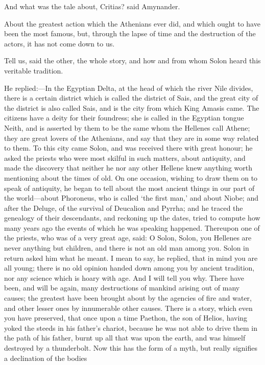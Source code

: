 And what was the tale about, Critias? said Amynander.

About the greatest action which the Athenians ever did, and which ought to
have been the most famous, but, through the lapse of time and the
destruction of the actors, it has not come down to us.

Tell us, said the other, the whole story, and how and from whom Solon
heard this veritable tradition.

He replied:—In the Egyptian Delta, at the head of which the river
Nile divides, there is a certain district which is called the district of
Sais, and the great city of the district is also called Sais, and is the
city from which King Amasis came. The citizens have a deity for their
foundress; she is called in the Egyptian tongue Neith, and is asserted by
them to be the same whom the Hellenes call Athene; they are great lovers
of the Athenians, and say that they are in some way related to them. To
this city came Solon, and was received there with great honour; he asked
the priests who were most skilful in such matters, about antiquity, and
made the discovery that neither he nor any other Hellene knew anything
worth mentioning about the times of old. On one occasion, wishing to draw
them on to speak of antiquity, he began to tell about the most ancient
things in our part of the world—about Phoroneus, who is called ‘the
first man,’ and about Niobe; and after the Deluge, of the survival of
Deucalion and Pyrrha; and he traced the genealogy of their descendants,
and reckoning up the dates, tried to compute how many years ago the events
of which he was speaking happened. Thereupon one of the priests, who was
of a very great age, said: O Solon, Solon, you Hellenes are never anything
but children, and there is not an old man among you. Solon in return asked
him what he meant. I mean to say, he replied, that in mind you are all
young; there is no old opinion handed down among you by ancient tradition,
nor any science which is hoary with age. And I will tell you why. There
have been, and will be again, many destructions of mankind arising out of
many causes; the greatest have been brought about by the agencies of fire
and water, and other lesser ones by innumerable other causes. There is a
story, which even you have preserved, that once upon a time Paethon, the
son of Helios, having yoked the steeds in his father’s chariot, because he
was not able to drive them in the path of his father, burnt up all that
was upon the earth, and was himself destroyed by a thunderbolt. Now this
has the form of a myth, but really signifies a declination of the bodies
